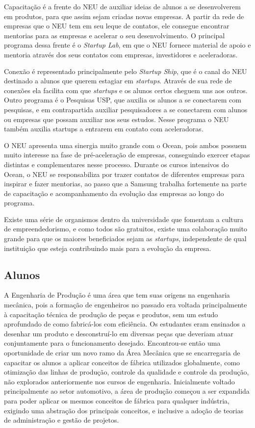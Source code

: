 Capacitação é a frente do NEU de auxiliar ideias de alunos a se desenvolverem em produtos, para que assim sejam criadas novas empresas. A partir da rede de empresas que o NEU tem em seu leque de contatos, ele consegue encontrar mentorias para as empresas e acelerar o seu desenvolvimento. O principal programa dessa frente é o \textit{Startup Lab}, em que o NEU fornece material de apoio e mentoria através dos seus contatos com empresas, investidores e aceleradoras.

Conexão é representado principalmente pelo \textit{Startup Ship}, que é o canal do NEU destinado a alunos que querem estagiar em \textit{startups}. Através de sua rede de conexões ela facilita com que \textit{startups} e os alunos certos cheguem uns aos outros. Outro programa é o Pesquisas USP, que auxilia os alunos a se conectarem com pesquisas, e em contrapartida auxiliar pesquisadores a se conectarem com alunos ou empresas que possam auxiliar nos seus estudos. Nesse programa o NEU também auxilia startups a entrarem em contato com aceleradoras.

O NEU apresenta uma sinergia muito grande com o Ocean, pois ambos possuem muito interesse na fase de pré-aceleração de empresas, conseguindo exercer etapas distintas e complementares nesse processo. Durante os cursos intensivos do Ocean, o NEU se responsabiliza por trazer contatos de diferentes empresas para inspirar e fazer mentorias, ao passo que a Samsung trabalha fortemente na parte de capacitação e acompanhamento da evolução das empresas ao longo do programa.

Existe uma série de organismos dentro da universidade que fomentam a cultura de empreendedorismo, e como todos são gratuitos, existe uma colaboração muito grande para que os maiores beneficiados sejam as \textit{startups}, independente de  qual instituição que esteja contribuindo mais para a evolução da empresa.

\subsection{Alunos}
\label{sec:con_alunos}

A Engenharia de Produção é uma área que tem suas origens na engenharia mecânica, pois a formação de engenheiros no passado era voltada principalmente à capacitação técnica de produção de peças e produtos, sem um estudo aprofundado de como fabricá-los com eficiência. Os estudantes eram ensinados a desenhar um produto e desconstruí-lo em diversas peças que deveriam atuar conjuntamente para o funcionamento desejado. Encontrou-se então uma oportunidade de criar um novo ramo da Área Mecânica que se encarregaria de capacitar os alunos a aplicar conceitos de fábrica utilizados globalmente, como otimização das linhas de produção, controle da qualidade e controle da produção, não explorados anteriormente nos cursos de engenharia. Inicialmente voltado principalmente ao setor automotivo, a área de produção começou a ser expandida para poder aplicar os mesmos conceitos de fábrica para qualquer indústria, exigindo uma abstração dos principais conceitos, e inclusive a adoção de teorias de administração e gestão de projetos.

